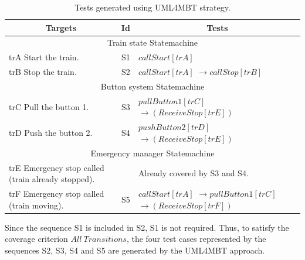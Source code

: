 \documentclass{llncs}
\begin{document}
\begin{table}[htp]
\centering
\vspace*{-.4cm}
\caption{Tests generated using UML4MBT strategy.}
\begin{small}
\begin{tabular}{|m{3.4cm}|c| m{3.2cm}|}
	\hline
	\multicolumn{1}{|c}{Targets} & \multicolumn{1}{|c|}{Id} & \multicolumn{1}{|c|}{Tests}
	\\ \hline
	\multicolumn{3}{|c|}{Train state Statemachine}
	\\ \hline
	trA \newline Start the train.
	&S1& $callStart[trA]$ 
	\\ \hline
	trB \newline Stop the train.
	&S2&  $callStart[trA]$\newline
	$\rightarrow callStop [trB]$
	\\ \hline
	\multicolumn{3}{|c|}{Button system Statemachine}
	\\ \hline
	trC \newline Pull the button 1. 
	&S3& $pullButton1 [trC]$\newline
	$\rightarrow (ReceiveStop[trE])$
	\\ \hline
	trD \newline Push the button 2.
	&S4& $pushButton2 [trD]$\newline
	$\rightarrow (ReceiveStop[trE])$
	\\ \hline
	\multicolumn{3}{|c|}{Emergency manager Statemachine}
	\\ \hline
	trE \newline Emergency stop called \newline (train already stopped).
	& & Already covered by S3 and S4.
	\\ \hline
	trF \newline Emergency stop called \newline (train moving).
	&S5& 
	$callStart [trA]$\newline
	$\rightarrow pullButton1[trC]$\newline
	$\rightarrow (ReceiveStop[trF])$
	\\ \hline
\end{tabular}
\end{small}
\label{genUML4MBT-jouet}
\vspace*{-.4cm}
\end{table}

Since the sequence S1 is included in S2, S1 is not required. Thus,
to satisfy the coverage criterion $All~Transitions$, the four test cases
represented by the sequences S2, S3, S4 and S5 are generated by the
UML4MBT approach.
\end{document}
